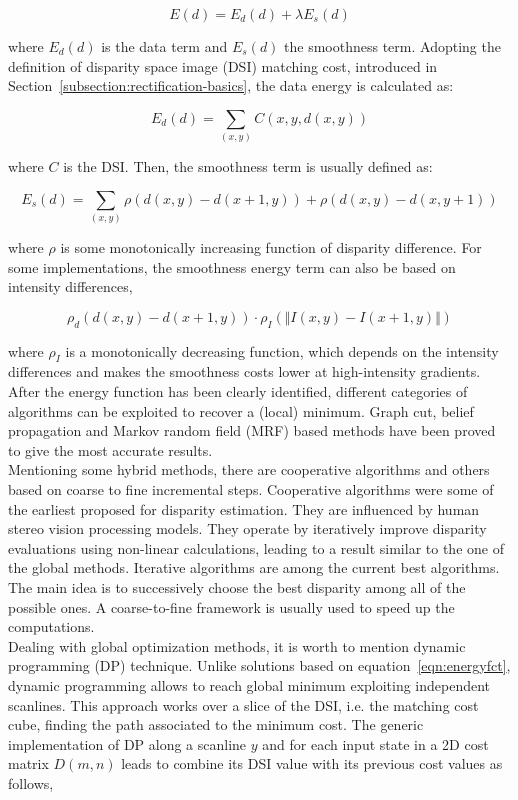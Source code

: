 \begin{equation}
\label{eqn:energyfct}
	E(d) = E_d(d) + \lambda E_s(d)
\end{equation}

where $E_d(d)$ is the data term and $E_s(d)$ the smoothness term.
Adopting the definition of disparity space image (DSI) matching cost, introduced in Section~\ref{subsection:rectification-basics}, the data energy is calculated as:

\begin{equation}
\label{eqn:dataterm}
	E_d(d) = \sum_{(x,y)} C(x, y, d(x, y))
\end{equation}

where $C$ is the DSI.
Then, the smoothness term is usually defined as:

\begin{equation}
\label{eqn:smoothterm}
	E_s(d) = \sum_{(x,y)} \rho (d(x,y) - d(x + 1, y)) + \rho (d(x,y) - d(x, y + 1))
\end{equation}

where $\rho$ is some monotonically increasing function of disparity difference. 
For some implementations, the smoothness energy term can also be based on intensity differences,

\begin{equation}
\label{eqn:smoothtermintensity}
	\rho_d(d(x,y) - d(x + 1, y)) \cdot \rho_I(\Vert I(x,y) - I(x + 1,y) \Vert)
\end{equation}

where $\rho_I$ is a monotonically decreasing function, which depends on the intensity differences and makes the smoothness costs lower at high-intensity gradients.\\
After the energy function has been clearly identified, different categories of algorithms can be exploited to recover a (local) minimum.
Graph cut, belief propagation and Markov random field (MRF) based methods have been proved to give the most accurate results. \\
Mentioning some hybrid methods, there are cooperative algorithms and others based on coarse to fine incremental steps.
Cooperative algorithms were some of the earliest proposed for disparity estimation. 
They are influenced by human stereo vision processing models. 
They operate by iteratively improve disparity evaluations using non-linear calculations, leading to a result similar to the one of the global methods.
Iterative algorithms are among the current best algorithms.
The main idea is to successively choose the best disparity among all of the possible ones. 
A coarse-to-fine framework is usually used to speed up the computations.\\
Dealing with global optimization methods, it is worth to mention dynamic programming (DP) technique.
Unlike solutions based on equation~\ref{eqn:energyfct}, dynamic programming allows to reach global minimum exploiting independent scanlines.
This approach works over a slice of the DSI, i.e. the matching cost cube, finding the path associated to the minimum cost.
The generic implementation of DP along a scanline $y$ and for each input state in a 2D cost matrix $D(m, n)$ leads to combine its DSI value with its previous cost values as follows,

